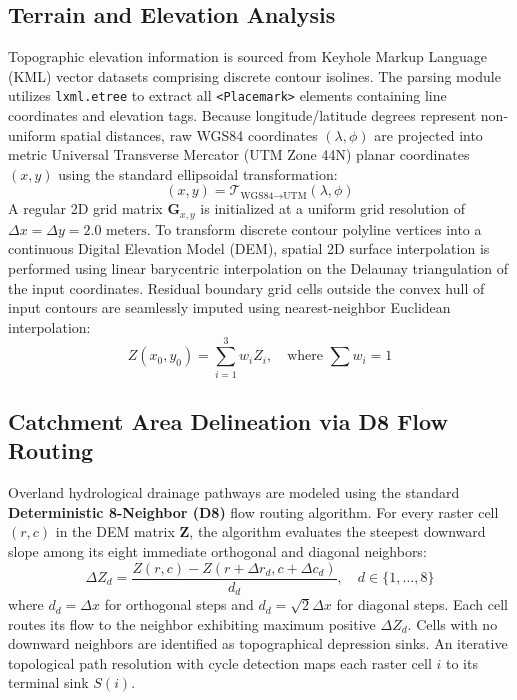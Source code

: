 \documentclass[manuscript,screen,review]{acmart}
\begin{document}
\subsection{Terrain and Elevation Analysis}
Topographic elevation information is sourced from Keyhole Markup Language (KML) vector datasets comprising discrete contour isolines. The parsing module utilizes \texttt{lxml.etree} to extract all \texttt{<Placemark>} elements containing line coordinates and elevation tags. Because longitude/latitude degrees represent non-uniform spatial distances, raw WGS84 coordinates $(\lambda, \phi)$ are projected into metric Universal Transverse Mercator (UTM Zone 44N) planar coordinates $(x, y)$ using the standard ellipsoidal transformation:
\begin{equation}
    (x, y) = \mathcal{T}_{\text{WGS84} \rightarrow \text{UTM}}(\lambda, \phi)
\end{equation}
A regular 2D grid matrix $\mathbf{G}_{x, y}$ is initialized at a uniform grid resolution of $\Delta x = \Delta y = 2.0\text{ meters}$. To transform discrete contour polyline vertices into a continuous Digital Elevation Model (DEM), spatial 2D surface interpolation is performed using linear barycentric interpolation on the Delaunay triangulation of the input coordinates. Residual boundary grid cells outside the convex hull of input contours are seamlessly imputed using nearest-neighbor Euclidean interpolation:
\begin{equation}
    Z(x_0, y_0) = \sum_{i=1}^3 w_i Z_i, \quad \text{where } \sum w_i = 1
\end{equation}

\subsection{Catchment Area Delineation via D8 Flow Routing}
Overland hydrological drainage pathways are modeled using the standard \textbf{Deterministic 8-Neighbor (D8)} flow routing algorithm. For every raster cell $(r, c)$ in the DEM matrix $\mathbf{Z}$, the algorithm evaluates the steepest downward slope among its eight immediate orthogonal and diagonal neighbors:
\begin{equation}
    \Delta Z_{d} = \frac{Z(r, c) - Z(r + \Delta r_d, c + \Delta c_d)}{d_d}, \quad d \in \{1, \dots, 8\}
\end{equation}
where $d_d = \Delta x$ for orthogonal steps and $d_d = \sqrt{2}\Delta x$ for diagonal steps. Each cell routes its flow to the neighbor exhibiting maximum positive $\Delta Z_d$. Cells with no downward neighbors are identified as topographical depression sinks. An iterative topological path resolution with cycle detection maps each raster cell $i$ to its terminal sink $S(i)$.
\end{document}
